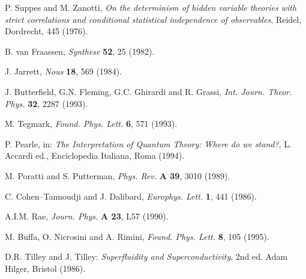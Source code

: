 \documentclass[10pt,a4paper]{article}
\begin{document}
\begin{thebibliography}{999}
 P. Suppes and M. Zanotti, {\it On the determinism of
hidden variable theories with strict correlations and conditional
statistical independence of observables}, Reidel, Dordrecht, 445
(1976).

 B. van Fraassen, {\it Synthese} {\bf 52}, 25
(1982).

 J. Jarrett, {\it Nous} {\bf 18}, 569 (1984).

 J. Butterfield, G.N. Fleming, G.C. Ghirardi and R.
Grassi, {\it Int. Journ. Theor. Phys.} {\bf 32}, 2287 (1993).

 M. Tegmark, {\it Found. Phys. Lett.} {\bf 6}, 571
(1993).

 P. Pearle, in: {\it The Interpretation of Quantum
Theory: Where do we stand?}, L. Accardi ed., Enciclopedia
Italiana, Roma (1994).

 M. Poratti and S. Putterman, {\it Phys. Rev.} {\bf A
39}, 3010 (1989).

 C. Cohen--Tannoudji and J. Dalibard, {\it Europhys.
Lett.} {\bf 1}, 441 (1986).

 A.I.M. Rae, {\it Journ. Phys.} {\bf A 23}, L57
(1990).

 M. Buffa, O. Nicrosini and A. Rimini, {\it Found. Phys.
Lett.} {\bf 8}, 105 (1995).

 D.R. Tilley and J. Tilley: {\it Superfluidity and
Superconductivity}, 2nd ed. Adam Hilger, Bristol (1986).

\end{thebibliography}
\end{document}
